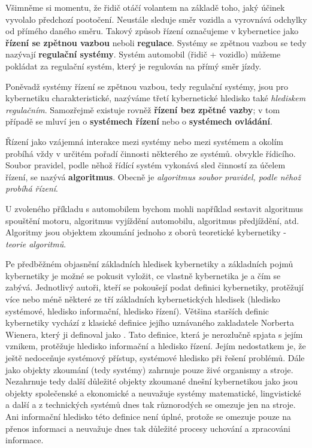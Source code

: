 {      Všimněme si momentu, že řidič otáčí volantem na základě toho, jaký účinek vyvolalo předchozí 
      pootočení. Neustále sleduje směr vozidla a vyrovnává odchylky od přímého daného směru. Takový 
      způsob řízení označujeme v kybernetice jako \textbf{řízení se zpětnou vazbou} neboli 
      \textbf{regulace}. Systémy se zpětnou vazbou se tedy nazývají \textbf{regulační systémy}. 
      Systém automobil (řidič + vozidlo) můžeme pokládat za regulační systém, který je regulován na 
      přímý směr jízdy.
      
      Poněvadž systémy řízení se zpětnou vazbou, tedy regulační systémy, jsou pro kybernetiku 
      charakteristické, nazýváme třetí kybernetické hledisko také \emph{hlediskem regulačním}. 
      Samozřejmě existuje rovněž \textbf{řízení bez zpětné vazby}; v tom případě se mluví jen o 
      \textbf{systémech řízení} nebo o \textbf{systémech ovládání}.
      
      Řízení jako vzájemná interakce mezi systémy nebo mezi systémem a okolím probíhá vždy v 
      určitém pořadí činnosti některého ze systémů. obvykle řídicího. Soubor pravidel, podle něhož 
      řídící systém vykonává sled činností za účelem řízení, se nazývá \textbf{algoritmus}. Obecně 
      je \emph{algoritmus soubor pravidel, podle něhož probíhá řízení}.
      
      U zvoleného příkladu s automobilem bychom mohli například sestavit algoritmus spouštění 
      motoru, algoritmus vyjíždění automobilu, algoritmus předjíždění, atd. Algoritmy jsou objektem 
      zkoumání jednoho z oborů teoretické kybernetiky - \emph{teorie algoritmů}.
      
      Pe předběžném objasnění základních hledisek kybernetiky a základních pojmů kybernetiky je 
      možné se pokusit vyložit, ce vlastně kybernetika je a čím se zabývá. Jednotlivý autoři, kteří 
      se pokoušejí podat definici kybernetiky, protěžují více nebo méně některé ze tří základních 
      kybernetických hledisek (hledisko systémové, hledisko informační, hledisko řízení). Většina 
      starších definic kybernetiky vychází z klasické definice jejího uznávaného zakladatele 
      Norberta Wienera, který ji definoval jako . Tato definice, která je nerozlučně spjata s jejím vznikem, protěžuje hledisko 
      informační a hledisko řízení. Jejím nedostatkem je, že ještě nedoceňuje systémový přístup, 
      systémové hledisko při řešení problémů. Dále jako objekty zkoumání (tedy systémy) zahrnuje 
      pouze živé organismy a stroje. Nezahrnuje tedy další důležité objekty zkoumané dnešní 
      kybernetikou jako jsou objekty společenské a ekonomické a neuvažuje systémy matematické, 
      lingvistické a další a z technických systémů dnes tak různorodých se omezuje jen na stroje. 
      Ani informační hledisko této definice není úplné, protože se omezuje pouze na přenos 
      informaci a neuvažuje dnes tak důležité procesy uchování a zpracováni informace.
      
}
